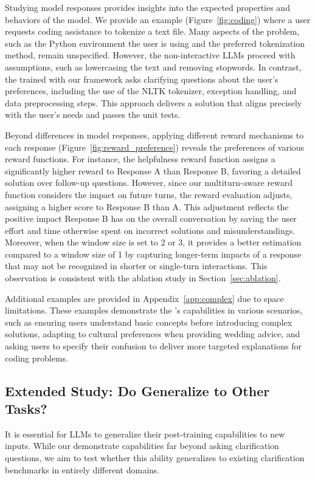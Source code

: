 
Studying model responses provides insights into the expected properties and behaviors of the model. We provide an example (Figure~\ref{fig:coding}) where a user requests coding assistance to tokenize a text file. Many aspects of the problem, such as the Python environment the user is using and the preferred tokenization method, remain unspecified. However, the non-interactive LLMs proceed with assumptions, such as lowercasing the text and removing stopwords. In contrast, the \object trained with our framework asks clarifying questions about the user's preferences, including the use of the NLTK tokenizer, exception handling, and data preprocessing steps. This approach delivers a solution that aligns precisely with the user’s needs and passes the unit tests.

Beyond differences in model responses, applying different reward mechanisms to each response (Figure~\ref{fig:reward_preference}) reveals the preferences of various reward functions. For instance, the helpfulness reward function assigns a significantly higher reward to Response A than Response B, favoring a detailed solution over follow-up questions. However, since our multiturn-aware reward function considers the impact on future turns, the reward evaluation adjusts, assigning a higher score to Response B than A. This adjustment reflects the positive impact Response B has on the overall conversation by saving the user effort and time otherwise spent on incorrect solutions and misunderstandings. Moreover, when the window size is set to 2 or 3, it provides a better estimation compared to a window size of 1 by capturing longer-term impacts of a response that may not be recognized in shorter or single-turn interactions. This observation is consistent with the ablation study in Section~\ref{sec:ablation}.

Additional examples are provided in Appendix~\ref{app:complex} due to space limitations. These examples demonstrate the \object's capabilities in various scenarios, such as ensuring users understand basic concepts before introducing complex solutions, adapting to cultural preferences when providing wedding advice, and asking users to specify their confusion to deliver more targeted explanations for coding problems.


\subsection{Extended Study: Do \Objects Generalize to Other Tasks?}
\label{sec:extended}
It is essential for LLMs to generalize their post-training capabilities to new inputs. While our \objects demonstrate capabilities far beyond asking clarification questions, we aim to test whether this ability generalizes to existing clarification benchmarks in entirely different domains.

